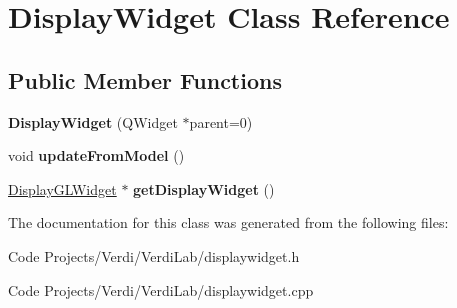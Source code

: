\hypertarget{class_display_widget}{\section{\-Display\-Widget \-Class \-Reference}
\label{class_display_widget}
}
\subsection*{\-Public \-Member \-Functions}
\begin{DoxyCompactItemize}
\item 
\hypertarget{class_display_widget_a261b88eddd495967c4229a6ea19dc244}{{\bfseries \-Display\-Widget} (\-Q\-Widget $\ast$parent=0)}\label{class_display_widget_a261b88eddd495967c4229a6ea19dc244}

\item 
\hypertarget{class_display_widget_a62e93c24d346ec43991137e21bbd92df}{void {\bfseries update\-From\-Model} ()}\label{class_display_widget_a62e93c24d346ec43991137e21bbd92df}

\item 
\hypertarget{class_display_widget_a7f5e561c2c3082bd95d680787151cf76}{\hyperlink{class_display_g_l_widget}{\-Display\-G\-L\-Widget} $\ast$ {\bfseries get\-Display\-Widget} ()}\label{class_display_widget_a7f5e561c2c3082bd95d680787151cf76}

\end{DoxyCompactItemize}


\-The documentation for this class was generated from the following files\-:\begin{DoxyCompactItemize}
\item 
\-Code Projects/\-Verdi/\-Verdi\-Lab/displaywidget.\-h\item 
\-Code Projects/\-Verdi/\-Verdi\-Lab/displaywidget.\-cpp\end{DoxyCompactItemize}
